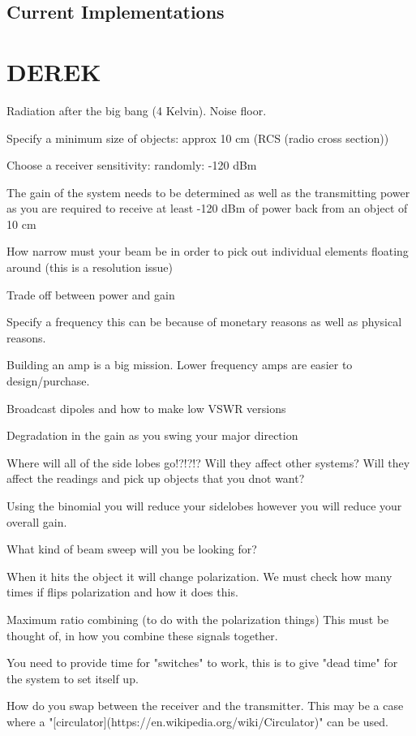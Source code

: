 \documentclass[11pt]{witseiepaper}
\begin{document}
\subsection{Current Implementations}

\section{DEREK}

Radiation after the big bang (4 Kelvin). 
Noise floor. 

Specify a minimum size of objects: approx 10 cm (RCS (radio cross section))

Choose a receiver sensitivity: randomly: -120 dBm

The gain of the system needs to be determined as well as the transmitting power as you are required to receive at least -120 dBm of power back from an object of 10 cm

How narrow must your beam be in order to pick out individual elements floating around (this is a resolution issue)

Trade off between power and gain

Specify a frequency this can be because of monetary reasons as well as physical reasons.

Building an amp is a big mission. Lower frequency amps are easier to design/purchase.

Broadcast dipoles and how to make low VSWR versions

Degradation in the gain as you swing your major direction

Where will all of the side lobes go!?!?!? Will they affect other systems? Will they affect the readings and pick up objects that you dnot want?

Using the binomial you will reduce your sidelobes however you will reduce your overall gain.

What kind of beam sweep will you be looking for?

When it hits the object it will change polarization. We must check how many times if flips polarization and how it does this.

Maximum ratio combining (to do with the polarization things) This must be thought of, in how you combine these signals together. 

You need to provide time for "switches" to work, this is to give "dead time" for the system to set itself up.

How do you swap between the receiver and the transmitter.
This may be a case where a "[circulator](https://en.wikipedia.org/wiki/Circulator)" can be used.
\end{document}
